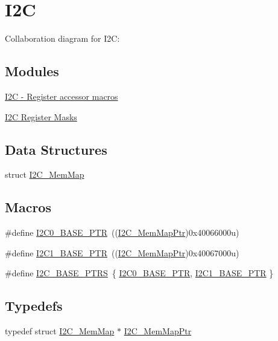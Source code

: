 \hypertarget{group___i2_c___peripheral}{}\section{I2C}
\label{group___i2_c___peripheral}
Collaboration diagram for I2C\+:
\subsection*{Modules}
\begin{DoxyCompactItemize}
\item 
\hyperlink{group___i2_c___register___accessor___macros}{I2\+C -\/ Register accessor macros}
\item 
\hyperlink{group___i2_c___register___masks}{I2\+C Register Masks}
\end{DoxyCompactItemize}
\subsection*{Data Structures}
\begin{DoxyCompactItemize}
\item 
struct \hyperlink{struct_i2_c___mem_map}{I2\+C\+\_\+\+Mem\+Map}
\end{DoxyCompactItemize}
\subsection*{Macros}
\begin{DoxyCompactItemize}
\item 
\#define \hyperlink{group___i2_c___peripheral_ga6db92fda81fa3b6a1c8c6a85e66d51a0}{I2\+C0\+\_\+\+B\+A\+S\+E\+\_\+\+P\+TR}~((\hyperlink{group___i2_c___peripheral_ga9902bc02a12982d0c37ec011b4dd89f0}{I2\+C\+\_\+\+Mem\+Map\+Ptr})0x40066000u)
\item 
\#define \hyperlink{group___i2_c___peripheral_gae13da5d584f2a4e2379db927a3f18772}{I2\+C1\+\_\+\+B\+A\+S\+E\+\_\+\+P\+TR}~((\hyperlink{group___i2_c___peripheral_ga9902bc02a12982d0c37ec011b4dd89f0}{I2\+C\+\_\+\+Mem\+Map\+Ptr})0x40067000u)
\item 
\#define \hyperlink{group___i2_c___peripheral_gaee17f364d6d1712b62774e6c33dea554}{I2\+C\+\_\+\+B\+A\+S\+E\+\_\+\+P\+T\+RS}~\{ \hyperlink{group___i2_c___peripheral_ga6db92fda81fa3b6a1c8c6a85e66d51a0}{I2\+C0\+\_\+\+B\+A\+S\+E\+\_\+\+P\+TR}, \hyperlink{group___i2_c___peripheral_gae13da5d584f2a4e2379db927a3f18772}{I2\+C1\+\_\+\+B\+A\+S\+E\+\_\+\+P\+TR} \}
\end{DoxyCompactItemize}
\subsection*{Typedefs}
\begin{DoxyCompactItemize}
\item 
typedef struct \hyperlink{struct_i2_c___mem_map}{I2\+C\+\_\+\+Mem\+Map} $\ast$ \hyperlink{group___i2_c___peripheral_ga9902bc02a12982d0c37ec011b4dd89f0}{I2\+C\+\_\+\+Mem\+Map\+Ptr}
\end{DoxyCompactItemize}


